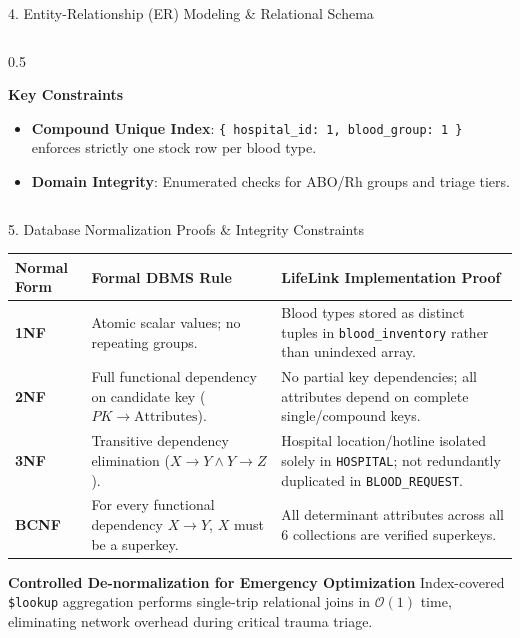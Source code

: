 \documentclass[aspectratio=169,10pt]{beamer}
\begin{document}
\begin{frame}{4. Entity-Relationship (ER) Modeling \& Relational Schema}
\begin{columns}[T]
\begin{column}{0.5\textwidth}
\begin{exampleblock}{\textbf{Key Constraints}}
                \scriptsize
                \begin{itemize}
                    \item \textbf{Compound Unique Index}: \texttt{\{ hospital\_id: 1, blood\_group: 1 \}} enforces strictly one stock row per blood type.
                    \item \textbf{Domain Integrity}: Enumerated checks for ABO/Rh groups and triage tiers.
                \end{itemize}
            \end{exampleblock}
        \end{column}
    \end{columns}
\end{frame}

\begin{frame}{5. Database Normalization Proofs \& Integrity Constraints}
    \begin{table}[H]
        \centering
        \scriptsize
        \begin{tabular}{lp{4.2cm}p{5.5cm}}
            \toprule
            \textbf{Normal Form} & \textbf{Formal DBMS Rule} & \textbf{LifeLink Implementation Proof} \\
            \midrule
            \textbf{1NF} & Atomic scalar values; no repeating groups. & Blood types stored as distinct tuples in \texttt{blood\_inventory} rather than unindexed array. \\
            \textbf{2NF} & Full functional dependency on candidate key ($PK \to \text{Attributes}$). & No partial key dependencies; all attributes depend on complete single/compound keys. \\
            \textbf{3NF} & Transitive dependency elimination ($X \to Y \land Y \to Z$). & Hospital location/hotline isolated solely in \texttt{HOSPITAL}; not redundantly duplicated in \texttt{BLOOD\_REQUEST}. \\
            \textbf{BCNF} & For every functional dependency $X \to Y$, $X$ must be a superkey. & All determinant attributes across all 6 collections are verified superkeys. \\
            \bottomrule
        \end{tabular}
    \end{table}

    \begin{block}{\textbf{Controlled De-normalization for Emergency Optimization}}
        \scriptsize Index-covered \texttt{\$lookup} aggregation performs single-trip relational joins in $\mathcal{O}(1)$ time, eliminating network overhead during critical trauma triage.
    \end{block}
\end{frame}
\end{document}
